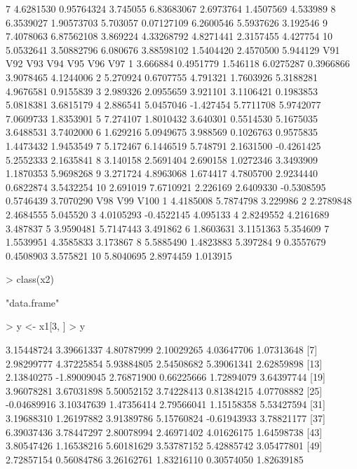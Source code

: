 \documentclass[12pt]{article}
\begin{document}
\begin{Schunk}
\begin{Soutput}
7   4.6281530  0.95764324 3.745055  6.83683067  2.6973764 1.4507569 4.533989
8   6.3539027  1.90573703 5.703057  0.07127109  6.2600546 5.5937626 3.192546
9   7.4078063  6.87562108 3.869224  4.33268792  4.8271441 2.3157455 4.427754
10  5.0532641  3.50882796 6.080676  3.88598102  1.5404420 2.4570500 5.944129
        V91       V92       V93       V94        V95       V96       V97
1  3.666884 0.4951779  1.546118 6.0275287  0.3966866 3.9078465 4.1244006
2  5.270924 0.6707755  4.791321 1.7603926  5.3188281 4.9676581 0.9155839
3  2.989326 2.0955659  3.921101 3.1106421  0.1983853 5.0818381 3.6815179
4  2.886541 5.0457046 -1.427454 5.7711708  5.9742077 7.0609733 1.8353901
5  7.274107 1.8010432  3.640301 0.5514530  5.1675035 3.6488531 3.7402000
6  1.629216 5.0949675  3.988569 0.1026763  0.9575835 1.4473432 1.9453549
7  5.172467 6.1446519  5.748791 2.1631500 -0.4261425 5.2552333 2.1635841
8  3.140158 2.5691404  2.690158 1.0272346  3.3493909 1.1870353 5.9698268
9  3.271724 4.8963068  1.674417 4.7805700  2.9234440 0.6822874 3.5432254
10 2.691019 7.6710921  2.226169 2.6409330 -0.5308595 0.5746439 3.7070290
         V98        V99     V100
1  4.4185008  5.7874798 3.229986
2  2.2789848  2.4684555 5.045520
3  4.0105293 -0.4522145 4.095133
4  2.8249552  4.2161689 3.487837
5  3.9590481  5.7147443 3.491862
6  1.8603631  3.1151363 5.354609
7  1.5539951  4.3585833 3.173867
8  5.5885490  1.4823883 5.397284
9  0.3557679  0.4508903 3.575821
10 5.8040695  2.8974459 1.013915
\end{Soutput}
\begin{Sinput}
> class(x2)
\end{Sinput}
\begin{Soutput}
[1] "data.frame"
\end{Soutput}
\begin{Sinput}
> y <- x1[3, ] 
> y
\end{Sinput}
\begin{Soutput}
  [1]  3.15448724  3.39661337  4.80787999  2.10029265  4.03647706  1.07313648
  [7]  2.98299777  4.37225854  5.93884805  2.54508682  5.39061341  2.62859898
 [13]  2.13840275 -1.89009045  2.76871900  0.66225666  1.72894079  3.64397744
 [19]  3.96078281  3.67031898  5.50052152  3.74228413  0.81384215  4.07708882
 [25] -0.04689916  3.10347639  1.47356414  2.79566041  1.15158358  5.53427594
 [31]  3.19688310  1.26197882  3.91389786  5.15760824 -0.61943933  3.78821177
 [37]  6.39037436  3.78447297  2.80078994  2.46971402  4.01626175  1.64598738
 [43]  3.80547426  1.16538216  5.60181629  3.53787152  5.42885742  3.05477801
 [49]  2.72857154  0.56084786  3.26162761  1.83216110  0.30574050  1.82639185

\end{Soutput}
\end{Schunk}
\end{document}
